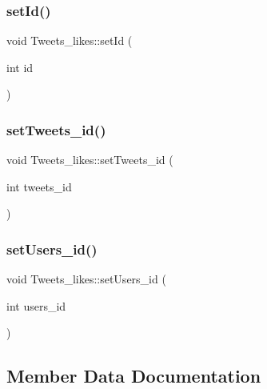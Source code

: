 \subsubsection{\texorpdfstring{set\+Id()}{setId()}}
{\footnotesize\ttfamily void Tweets\+\_\+likes\+::set\+Id (\begin{DoxyParamCaption}\item[{int}]{id }\end{DoxyParamCaption})}

\mbox{\label{class_tweets__likes_a1fc426728ccc5de054bb04b46a2dcea3}} 
\subsubsection{\texorpdfstring{set\+Tweets\+\_\+id()}{setTweets\_id()}}
{\footnotesize\ttfamily void Tweets\+\_\+likes\+::set\+Tweets\+\_\+id (\begin{DoxyParamCaption}\item[{int}]{tweets\+\_\+id }\end{DoxyParamCaption})}

\mbox{\label{class_tweets__likes_acd0888290310f6f5a29eedd07a3a5a4c}} 
\subsubsection{\texorpdfstring{set\+Users\+\_\+id()}{setUsers\_id()}}
{\footnotesize\ttfamily void Tweets\+\_\+likes\+::set\+Users\+\_\+id (\begin{DoxyParamCaption}\item[{int}]{users\+\_\+id }\end{DoxyParamCaption})}



\subsection{Member Data Documentation}
\mbox{\label{class_tweets__likes_a9505ceba5a0326da289b7cf1142d8ad6}} 
